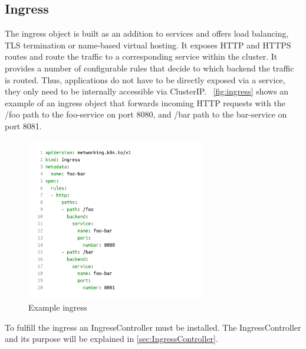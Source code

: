 \subsection{Ingress}\label{subsec:ingress}
The ingress object is built as an addition to services and offers load balancing, TLS termination or name-based virtual hosting.
It exposes HTTP and HTTPS routes and route the traffic to a corresponding service within the cluster.
It provides a number of configurable rules that decide to which backend the traffic is routed.
Thus, applications do not have to be directly exposed via a service, they only need to be internally accessible via ClusterIP.~\cite{KUBERNETES-INGRESS}
\autoref{fig:ingress} shows an example of an ingress object that forwards incoming HTTP requests with the /foo path to the foo-service on port 8080, and /bar path to the bar-service on port 8081.

\begin{figure}[H]
    \centering
    \includegraphics[width=0.7\textwidth, left]{media/02/ingress}
    \caption{Example ingress}
    \label{fig:ingress}
\end{figure}

To fulfill the ingress an IngressController must be installed.
The IngressController and its purpose will be explained in \autoref{sec:IngressController}.
